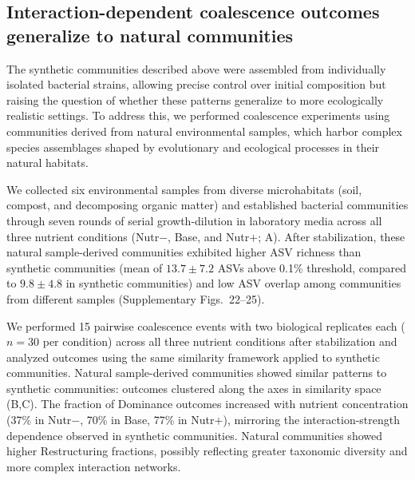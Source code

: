 \subsection{Interaction-dependent coalescence outcomes generalize to natural communities}
\label{sec:results:natural_communities}

The synthetic communities described above were assembled from individually isolated bacterial strains, allowing precise control over initial composition but raising the question of whether these patterns generalize to more ecologically realistic settings. To address this, we performed coalescence experiments using communities derived from natural environmental samples, which harbor complex species assemblages shaped by evolutionary and ecological processes in their natural habitats.

We collected six environmental samples from diverse microhabitats (soil, compost, and decomposing organic matter) and established bacterial communities through seven rounds of serial growth-dilution in laboratory media across all three nutrient conditions (Nutr$-$, Base, and Nutr$+$; A). After stabilization, these natural sample-derived communities exhibited higher ASV richness than synthetic communities (mean of $13.7 \pm 7.2$ ASVs above 0.1\% threshold, compared to $9.8 \pm 4.8$ in synthetic communities) and low ASV overlap among communities from different samples (Supplementary Figs.~22–25).

We performed 15 pairwise coalescence events with two biological replicates each ($n = 30$ per condition) across all three nutrient conditions after stabilization and analyzed outcomes using the same similarity framework applied to synthetic communities. Natural sample-derived communities showed similar patterns to synthetic communities: outcomes clustered along the axes in similarity space (B,C). The fraction of Dominance outcomes increased with nutrient concentration (37\% in Nutr$-$, 70\% in Base, 77\% in Nutr$+$), mirroring the interaction-strength dependence observed in synthetic communities. Natural communities showed higher Restructuring fractions, possibly reflecting greater taxonomic diversity and more complex interaction networks. 

